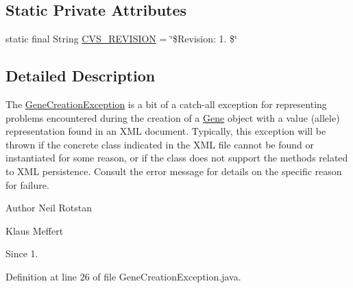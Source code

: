 \subsection*{Static Private Attributes}
\begin{DoxyCompactItemize}
\item 
static final String \hyperlink{classorg_1_1jgap_1_1xml_1_1_gene_creation_exception_a155293cbb9d14557cfc4d49eca797322}{C\-V\-S\-\_\-\-R\-E\-V\-I\-S\-I\-O\-N} = \char`\"{}\$Revision\-: 1. \$\char`\"{}
\end{DoxyCompactItemize}


\subsection{Detailed Description}
The \hyperlink{classorg_1_1jgap_1_1xml_1_1_gene_creation_exception}{Gene\-Creation\-Exception} is a bit of a catch-\/all exception for representing problems encountered during the creation of a \hyperlink{interfaceorg_1_1jgap_1_1_gene}{Gene} object with a value (allele) representation found in an X\-M\-L document. Typically, this exception will be thrown if the concrete class indicated in the X\-M\-L file cannot be found or instantiated for some reason, or if the class does not support the methods related to X\-M\-L persistence. Consult the error message for details on the specific reason for failure.

\begin{DoxyAuthor}{Author}
Neil Rotstan 

Klaus Meffert 
\end{DoxyAuthor}
\begin{DoxySince}{Since}
1. 
\end{DoxySince}


Definition at line 26 of file Gene\-Creation\-Exception.\-java.




